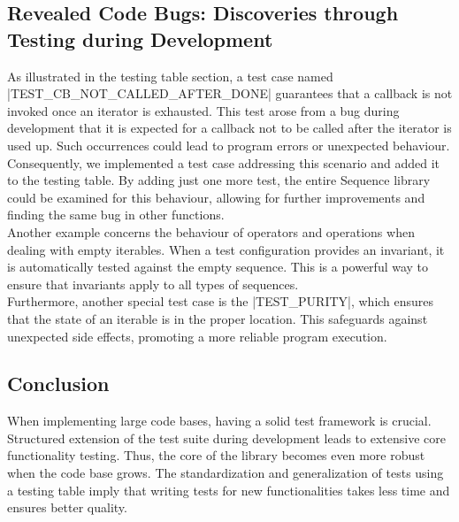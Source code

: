 \subsection{Revealed Code Bugs: Discoveries through Testing during Development}
\label{sub:Revealed Code Bugs: Discoveries through Testing during Development}
As illustrated in the testing table section, a test case named
|TEST_CB_NOT_CALLED_AFTER_DONE| guarantees that a callback is not invoked once
an iterator is exhausted. This test arose from a bug during development
that it is expected for a callback not to be called after the iterator is used
up. Such occurrences could lead to program errors or unexpected behaviour.
Consequently, we implemented a test case addressing this scenario and added it
to the testing table. By adding just one more test, the entire Sequence library
could be examined for this behaviour, allowing for further improvements and
finding the same bug in other functions.\\
Another example concerns the behaviour of operators and operations when dealing
with empty iterables. When a test configuration provides an invariant,
it is automatically tested against the empty sequence. This is a powerful way
to ensure that invariants apply to all types of sequences.\\
Furthermore, another special test case is the |TEST_PURITY|, which ensures that
the state of an iterable is in the proper location. This safeguards against
unexpected side effects, promoting a more reliable program execution.

\subsection{Conclusion}
\label{sub:Conclusion}
When implementing large code bases, having a solid test framework is crucial.
Structured extension of the test suite during development leads to extensive
core functionality testing. Thus, the core of the library becomes even more
robust when the code base grows.
\newline
The standardization and generalization of tests using a testing table imply that
writing tests for new functionalities takes less time and ensures better
quality.
